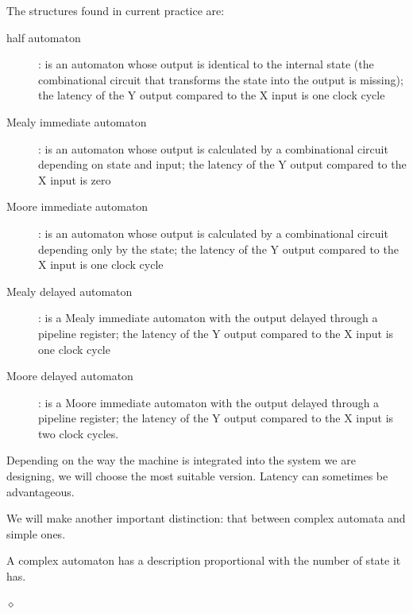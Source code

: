 The structures found in current practice are:
\begin{description}
    \item[half automaton]: is an automaton whose output is identical to the internal state (the combinational circuit that transforms the state into the output is missing); the latency of the Y output compared to the X input is one clock cycle
    \item[Mealy immediate automaton]: is an automaton whose output is calculated by a combinational circuit depending on state and input; the latency of the Y output compared to the X input is zero
    \item[Moore immediate automaton]: is an automaton whose output is calculated by a combinational circuit depending only by the state; the latency of the Y output compared to the X input is one clock cycle
    \item[Mealy delayed automaton]: is a Mealy immediate automaton with the output delayed through a pipeline register; the latency of the Y output compared to the X input is one clock cycle
    \item[Moore delayed automaton]: is a Moore immediate automaton with the output delayed through a pipeline register; the latency of the Y output compared to the X input is two clock cycles.
\end{description}
Depending on the way the machine is integrated into the system we are designing, we will choose the most suitable version. Latency can sometimes be advantageous.





We will make another important distinction: that between complex automata and simple ones.

\begin{definition}
A complex automaton has a description proportional with the number of state it has.

$\diamond$
\end{definition}

